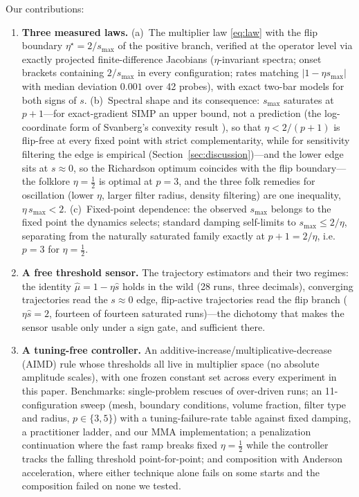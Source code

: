 \documentclass[11pt,a4paper]{article}
\newcommand{\smax}{s_{\max}}
\newcommand{\etastar}{\eta^{\star}}
\newcommand{\muh}{\hat{\mu}}
\newcommand{\sh}{\hat{s}}
\begin{document}
Our contributions:
\begin{enumerate}
\item \textbf{Three measured laws.} (a)~The multiplier law
  \eqref{eq:law} with the flip boundary $\etastar=2/\smax$ of the
  positive branch, verified at the operator level via exactly projected
  finite-difference Jacobians ($\eta$-invariant spectra; onset brackets
  containing $2/\smax$ in every configuration; rates matching
  $|1-\eta\smax|$ with median deviation $0.001$ over 42 probes), with
  exact two-bar models for both signs of $s$. (b)~Spectral shape and
  its consequence: $\smax$ saturates at $p{+}1$---for exact-gradient
  SIMP an upper bound, not a prediction (the log-coordinate form of
  Svanberg's convexity result \citep{svanberg1994convexity}), so that
  $\eta<2/(p{+}1)$ is flip-free at every fixed point with strict
  complementarity, while for sensitivity filtering the edge is
  empirical (Section~\ref{sec:discussion})---and the lower edge
  sits at $s\approx0$, so the Richardson optimum coincides with the
  flip boundary---the folklore $\eta=\tfrac12$ is optimal at $p=3$, and
  the three folk remedies for oscillation (lower $\eta$, larger filter
  radius, density filtering) are one inequality, $\eta\,\smax<2$.
  (c)~Fixed-point dependence: the observed $\smax$ belongs to the fixed
  point the dynamics selects; standard damping self-limits to
  $\smax\le2/\eta$, separating from the naturally saturated family
  exactly at $p{+}1=2/\eta$, i.e.\ $p=3$ for $\eta=\tfrac12$.
\item \textbf{A free threshold sensor.} The trajectory estimators and
  their two regimes: the identity $\muh=1-\eta\sh$ holds in the wild (28
  runs, three decimals), converging trajectories read the $s\approx0$
  edge, flip-active trajectories read the flip branch ($\eta\sh=2$,
  fourteen of fourteen saturated runs)---the dichotomy that makes the
  sensor usable only under a sign gate, and sufficient there.
\item \textbf{A tuning-free controller.} An
  additive-increase/multiplicative-decrease (AIMD) rule whose thresholds
  all live in multiplier space (no absolute amplitude scales), with one
  frozen constant set across every experiment in this paper. Benchmarks:
  single-problem rescues of over-driven runs; an 11-configuration sweep
  (mesh, boundary conditions, volume fraction, filter type and radius,
  $p\in\{3,5\}$) with a tuning-failure-rate table against fixed damping,
  a practitioner ladder, and our MMA implementation; a penalization
  continuation where the fast ramp breaks fixed $\eta=\tfrac12$ while
  the controller tracks the falling threshold point-for-point; and
  composition with Anderson acceleration, where either technique alone
  fails on some starts and the composition failed on none we tested.
\end{enumerate}
\end{document}
